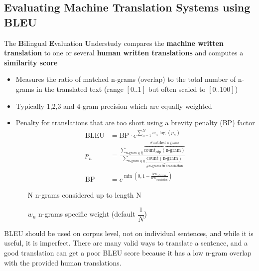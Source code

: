 \documentclass[11pt]{article}
\begin{document}
\subsection{Evaluating Machine Translation Systems using BLEU}
The \textbf{B}i\textbf{l}ingual \textbf{E}valuation \textbf{U}nderstudy compares the \textbf{machine written translation} to one or several \textbf{human written translations} and computes a \textbf{similarity score}
\begin{itemize}[label=-]
	\item Measures the ratio of matched n-grams (overlap) to the total number of n-grams in the translated text (range $[0..1]$ but often scaled to $[0..100]$)
	\item Typically 1,2,3 and 4-gram precision which are equally weighted
	\item Penalty for translations that are too short using a brevity penalty (BP) factor
	\begin{align*}
		\text{BLEU} &= \text{BP}\cdot e^{\sum_{n=1}^{N} w_n\log(p_n)}\\
		p_n &= \frac{\sum_{\text{n-gram}\in \hat{y}} \overbrace{\text{count}_{\text{clip}}(\text{n-gram})}^{\text{\# matched n-grams}}}{\sum_{\text{n-gram}\in \hat{y}} \underbrace{\text{count}(\text{n-gram})}_{\text{\# n-grams in translation}}}\\
		\text{BP} &= e^{\min\left( 0, 1-\frac{\text{len}_{\text{reference}}}{\text{len}_{\text{translation}}} \right)}
	\end{align*}
	\begin{itemize}
		\item[N] n-grams considered up to length N
		\item[$w_n$] n-grams specific weight (default $\dfrac{1}{N}$)
	\end{itemize}
\end{itemize}
BLEU should be used on corpus level, not on individual sentences, and while it is useful, it is imperfect. There are many valid ways to translate a sentence, and a good translation can get a poor BLEU score because it has a low n-gram overlap with the provided human translations.
\end{document}
